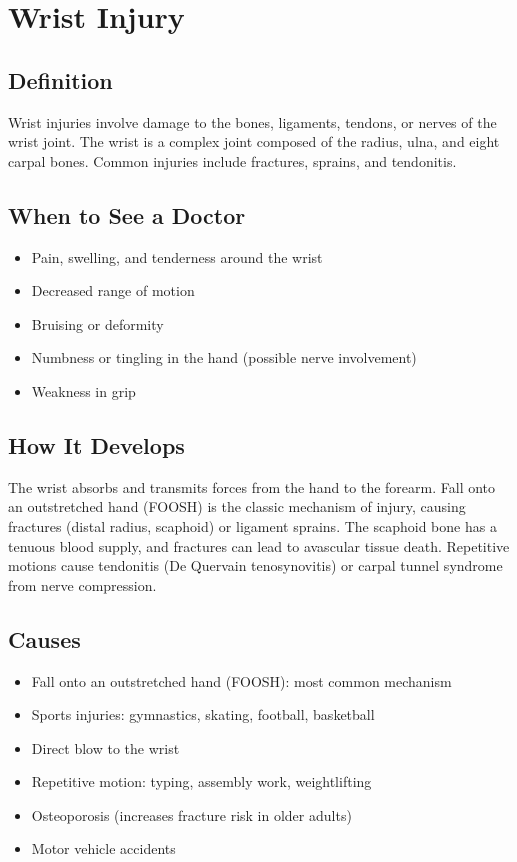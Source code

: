\chapter{Wrist Injury}

\section*{Definition}
Wrist injuries involve damage to the bones, ligaments, tendons, or nerves of the wrist joint. The wrist is a complex joint composed of the radius, ulna, and eight carpal bones. Common injuries include fractures, sprains, and tendonitis.

\section*{When to See a Doctor}
\begin{itemize}
\item Pain, swelling, and tenderness around the wrist
\item Decreased range of motion
\item Bruising or deformity
\item Numbness or tingling in the hand (possible nerve involvement)
\item Weakness in grip
\end{itemize}

\section*{How It Develops}
The wrist absorbs and transmits forces from the hand to the forearm. Fall onto an outstretched hand (FOOSH) is the classic mechanism of injury, causing fractures (distal radius, scaphoid) or ligament sprains. The scaphoid bone has a tenuous blood supply, and fractures can lead to avascular tissue death. Repetitive motions cause tendonitis (De Quervain tenosynovitis) or carpal tunnel syndrome from nerve compression.

\section*{Causes}
\begin{itemize}
\item Fall onto an outstretched hand (FOOSH): most common mechanism
\item Sports injuries: gymnastics, skating, football, basketball
\item Direct blow to the wrist
\item Repetitive motion: typing, assembly work, weightlifting
\item Osteoporosis (increases fracture risk in older adults)
\item Motor vehicle accidents
\end{itemize}

